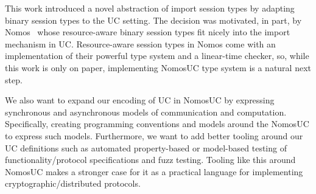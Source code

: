 This work introduced a novel abstraction of import session types by adapting binary session types to the UC setting.
The decision was motivated, in part, by Nomos~\cite{das2018work, dasnomos} whose resource-aware binary session types
fit nicely into the import mechanism in UC.
Resource-aware session types in Nomos come with an implementation of their powerful type system and a linear-time checker,
so, while this work is only on paper, implementing NomosUC type system is a natural next step.

We also want to expand our encoding of UC in NomosUC by expressing synchronous and asynchronous models of communication and computation. 
Specifically, creating programming conventions and models around the NomosUC to express such models.
Furthermore, we want to add better tooling around our UC definitions such as automated property-based
or model-based testing of functionality/protocol specifications and fuzz testing. 
Tooling like this around NomosUC makes a stronger case for it as a practical language for implementing cryptographic/distributed protocols.


